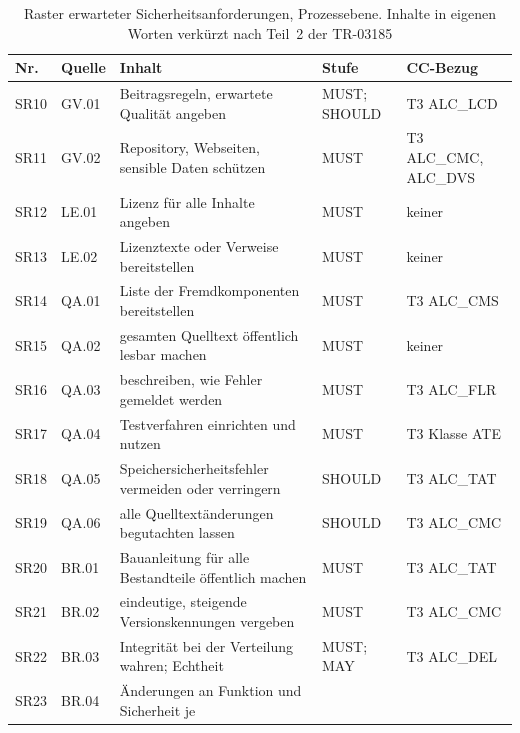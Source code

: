 \documentclass[11pt,a4paper]{report}
\begin{document}
\begin{table}[htbp]
  \centering
  \footnotesize
  \setlength{\tabcolsep}{3.5pt}
  \caption{Raster erwarteter Sicherheitsanforderungen, Prozessebene.
    Inhalte in eigenen Worten verkürzt nach Teil~2 der TR-03185
    \cite[Abschn.~2.3]{bsitr03185}}
  \label{tab:sicherheitsraster-prozess}
  \begin{tabular}{@{}>{\raggedright\arraybackslash}p{1.0cm}%
                    >{\raggedright\arraybackslash}p{1.6cm}%
                    >{\raggedright\arraybackslash}p{5.9cm}%
                    >{\raggedright\arraybackslash}p{1.6cm}%
                    >{\raggedright\arraybackslash}p{2.9cm}@{}}
    \toprule
    \textbf{Nr.} & \textbf{Quelle} & \textbf{Inhalt} & \textbf{Stufe} &
      \textbf{CC-Bezug} \\
    \midrule
    SR10 & GV.01 & Beitragsregeln, erwartete Qualität angeben &
      MUST; SHOULD & T3 ALC\_LCD \\
    SR11 & GV.02 & Repository, Webseiten, sensible Daten schützen & MUST &
      T3 ALC\_CMC, ALC\_DVS \\
    SR12 & LE.01 & Lizenz für alle Inhalte angeben & MUST & keiner \\
    SR13 & LE.02 & Lizenztexte oder Verweise bereitstellen & MUST &
      keiner \\
    SR14 & QA.01 & Liste der Fremdkomponenten bereitstellen & MUST &
      T3 ALC\_CMS \\
    SR15 & QA.02 & gesamten Quelltext öffentlich lesbar machen & MUST &
      keiner \\
    SR16 & QA.03 & beschreiben, wie Fehler gemeldet werden & MUST &
      T3 ALC\_FLR \\
    SR17 & QA.04 & Testverfahren einrichten und nutzen & MUST &
      T3 Klasse ATE \\
    SR18 & QA.05 & Speichersicherheitsfehler vermeiden oder verringern &
      SHOULD & T3 ALC\_TAT \\
    SR19 & QA.06 & alle Quelltextänderungen begutachten lassen & SHOULD &
      T3 ALC\_CMC \\
    SR20 & BR.01 & Bauanleitung für alle Bestandteile öffentlich machen &
      MUST & T3 ALC\_TAT \\
    SR21 & BR.02 & eindeutige, steigende Versionskennungen vergeben &
      MUST & T3 ALC\_CMC \\
    SR22 & BR.03 & Integrität bei der Verteilung wahren; Echtheit &
      MUST; MAY & T3 ALC\_DEL \\
    SR23 & BR.04 & Änderungen an Funktion und Sicherheit je

\end{tabular}
\end{table}
\end{document}
